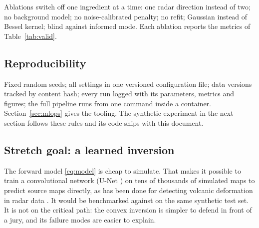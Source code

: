Ablations switch off one ingredient at a time: one radar direction instead of two; no background
model; no noise-calibrated penalty; no refit; Gaussian instead of Bessel kernel; blind against
informed mode. Each ablation reports the metrics of Table~\ref{tab:valid}.

\subsection{Reproducibility}

Fixed random seeds; all settings in one versioned configuration file; data versions tracked by
content hash; every run logged with its parameters, metrics and figures; the full pipeline runs from
one command inside a container. Section~\ref{sec:mlops} gives the tooling. The synthetic experiment
in the next section follows these rules and its code ships with this document.

\subsection{Stretch goal: a learned inversion}

The forward model \eqref{eq:model} is cheap to simulate. That makes it possible to train a
convolutional network (U-Net \cite{ronneberger2015}) on tens of thousands of simulated maps to
predict source maps directly, as has been done for detecting volcanic deformation in radar data
\cite{anantrasirichai2018}. It would be benchmarked against  on the same synthetic test set.
It is not on the critical path: the convex inversion is simpler to defend in front of a jury, and
its failure modes are easier to explain.

